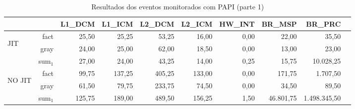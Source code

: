\begin{table}[ht!]
  \caption{Resultados dos eventos monitorados com PAPI (parte 1) \label{detalhes1}}
  \centering
  \footnotesize
  \begin{tabular}{l r r r r r r r r r}
    \toprule
    & & L1\_DCM & L1\_ICM & L2\_DCM & L2\_ICM & HW\_INT & BR\_MSP &
    BR\_PRC \\
    \midrule

    \multirow{3}{*}{\begin{sideways}JIT\end{sideways}} &
    fact & 25,50&25,25&53,25&16,00&0,00&22,00&35,50 \\
    & gray & 24,00&25,00&62,00&18,50&0,00&13,00&23,00  \\
    & sum$_1$ & 27,00&24,00&43,25&14,00&0,25&15,75&10.028,25 \\

    \midrule

    \multirow{3}{*}{\begin{sideways}NO JIT\end{sideways}} &
    fact &99,75&137,25&405,25&133,00&0,00&171,75&1.707,50   \\
    & gray & 61,50&79,75&233,75&74,50&0,00&34,50&89,50 \\
    & sum$_1$ & 125,75&189,00&489,50&156,25&1,50&46.801,75&1.498.345,50  \\
    \bottomrule
  \end{tabular}
\end{table}
